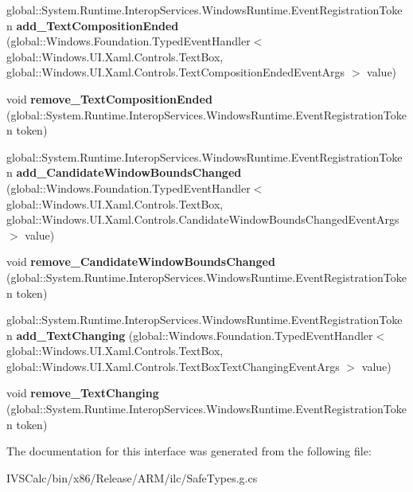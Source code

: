 \begin{DoxyCompactItemize}
\mbox{\label{interface_windows_1_1_u_i_1_1_xaml_1_1_controls_1_1_i_text_box3_a954246509dfb0e6ccf8afcceb314875e}} 
global\+::\+System.\+Runtime.\+Interop\+Services.\+Windows\+Runtime.\+Event\+Registration\+Token {\bfseries add\+\_\+\+Text\+Composition\+Ended} (global\+::\+Windows.\+Foundation.\+Typed\+Event\+Handler$<$ global\+::\+Windows.\+U\+I.\+Xaml.\+Controls.\+Text\+Box, global\+::\+Windows.\+U\+I.\+Xaml.\+Controls.\+Text\+Composition\+Ended\+Event\+Args $>$ value)
\item 
\mbox{\label{interface_windows_1_1_u_i_1_1_xaml_1_1_controls_1_1_i_text_box3_a1eca96501dfb3670f5fe1de3606e2c05}} 
void {\bfseries remove\+\_\+\+Text\+Composition\+Ended} (global\+::\+System.\+Runtime.\+Interop\+Services.\+Windows\+Runtime.\+Event\+Registration\+Token token)
\item 
\mbox{\label{interface_windows_1_1_u_i_1_1_xaml_1_1_controls_1_1_i_text_box3_af4821dda073f7c190c8b91cbd457a08d}} 
global\+::\+System.\+Runtime.\+Interop\+Services.\+Windows\+Runtime.\+Event\+Registration\+Token {\bfseries add\+\_\+\+Candidate\+Window\+Bounds\+Changed} (global\+::\+Windows.\+Foundation.\+Typed\+Event\+Handler$<$ global\+::\+Windows.\+U\+I.\+Xaml.\+Controls.\+Text\+Box, global\+::\+Windows.\+U\+I.\+Xaml.\+Controls.\+Candidate\+Window\+Bounds\+Changed\+Event\+Args $>$ value)
\item 
\mbox{\label{interface_windows_1_1_u_i_1_1_xaml_1_1_controls_1_1_i_text_box3_a0bc959a10affe7408662639bed13c278}} 
void {\bfseries remove\+\_\+\+Candidate\+Window\+Bounds\+Changed} (global\+::\+System.\+Runtime.\+Interop\+Services.\+Windows\+Runtime.\+Event\+Registration\+Token token)
\item 
\mbox{\label{interface_windows_1_1_u_i_1_1_xaml_1_1_controls_1_1_i_text_box3_a920756886d20926b07cab72000c0e58c}} 
global\+::\+System.\+Runtime.\+Interop\+Services.\+Windows\+Runtime.\+Event\+Registration\+Token {\bfseries add\+\_\+\+Text\+Changing} (global\+::\+Windows.\+Foundation.\+Typed\+Event\+Handler$<$ global\+::\+Windows.\+U\+I.\+Xaml.\+Controls.\+Text\+Box, global\+::\+Windows.\+U\+I.\+Xaml.\+Controls.\+Text\+Box\+Text\+Changing\+Event\+Args $>$ value)
\item 
\mbox{\label{interface_windows_1_1_u_i_1_1_xaml_1_1_controls_1_1_i_text_box3_ab1b93537fe8078d2bd946a3a5a093e83}} 
void {\bfseries remove\+\_\+\+Text\+Changing} (global\+::\+System.\+Runtime.\+Interop\+Services.\+Windows\+Runtime.\+Event\+Registration\+Token token)
\end{DoxyCompactItemize}


The documentation for this interface was generated from the following file\+:\begin{DoxyCompactItemize}
\item 
I\+V\+S\+Calc/bin/x86/\+Release/\+A\+R\+M/ilc/Safe\+Types.\+g.\+cs\end{DoxyCompactItemize}
